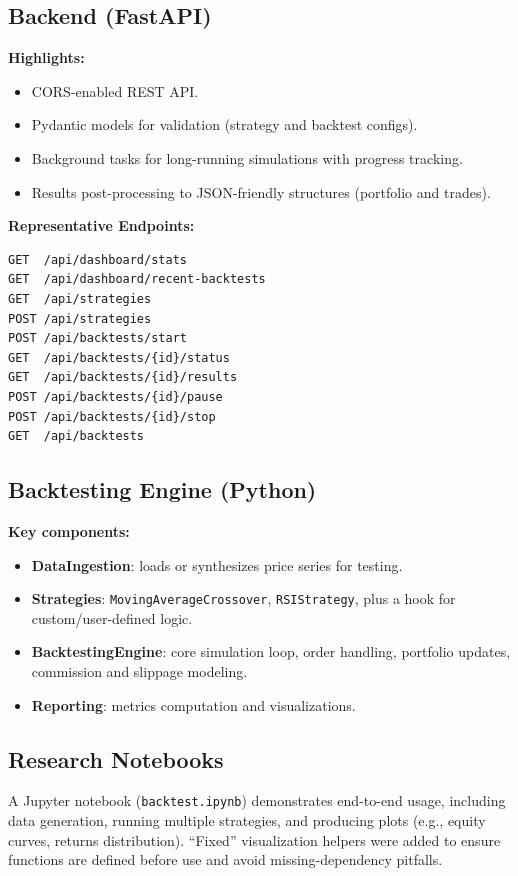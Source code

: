\documentclass[11pt,a4paper]{article}
\begin{document}
\subsection{Backend (FastAPI)}
\textbf{Highlights:}
\begin{itemize}[leftmargin=*]
  \item CORS-enabled REST API.
  \item Pydantic models for validation (strategy and backtest configs).
  \item Background tasks for long-running simulations with progress tracking.
  \item Results post-processing to JSON-friendly structures (portfolio and trades).
\end{itemize}
\textbf{Representative Endpoints:}
\begin{lstlisting}[style=code]
GET  /api/dashboard/stats
GET  /api/dashboard/recent-backtests
GET  /api/strategies
POST /api/strategies
POST /api/backtests/start
GET  /api/backtests/{id}/status
GET  /api/backtests/{id}/results
POST /api/backtests/{id}/pause
POST /api/backtests/{id}/stop
GET  /api/backtests
\end{lstlisting}

\subsection{Backtesting Engine (Python)}
\textbf{Key components:}
\begin{itemize}[leftmargin=*]
  \item \textbf{DataIngestion}: loads or synthesizes price series for testing.
  \item \textbf{Strategies}: \texttt{MovingAverageCrossover}, \texttt{RSIStrategy}, plus a hook for custom/user-defined logic.
  \item \textbf{BacktestingEngine}: core simulation loop, order handling, portfolio updates, commission and slippage modeling.
  \item \textbf{Reporting}: metrics computation and visualizations.
\end{itemize}

\subsection{Research Notebooks}
A Jupyter notebook (\texttt{backtest.ipynb}) demonstrates end-to-end usage, including data generation, running multiple strategies, and producing plots (e.g., equity curves, returns distribution). ``Fixed'' visualization helpers were added to ensure functions are defined before use and avoid missing-dependency pitfalls.
\end{document}
